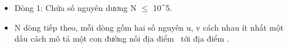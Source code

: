 \begin{itemize}
	\item Dòng 1: Chứa số nguyên dương N  $\le$  10^5.
	\item N dòng tiếp theo, mỗi dòng gồm hai số nguyên u, v cách nhau ít nhất một dấu cách mô tả một con đường nối địa điểm  tới địa điểm .
\end{itemize}

\